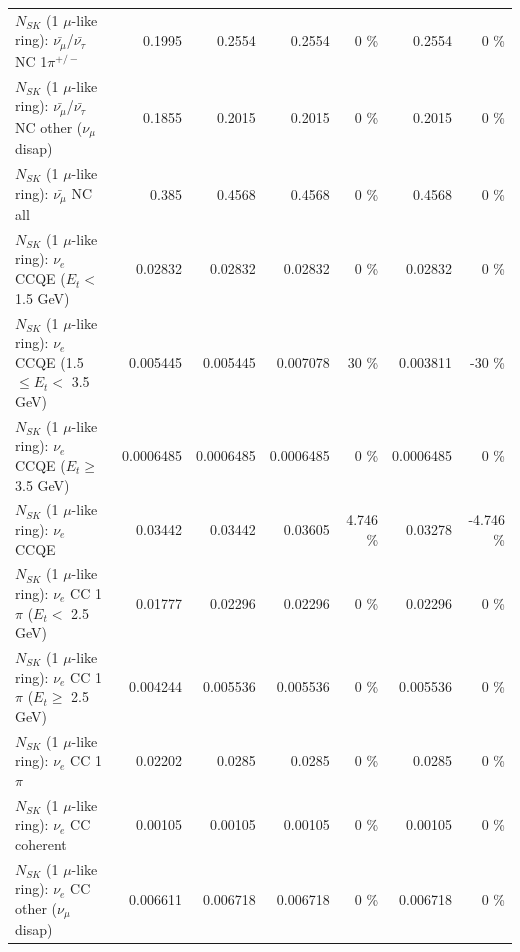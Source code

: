 \begin{table}
\begin{tabular}{| l | r | r | r  r | r  r |}
\hline
  $N_{SK}$ (1 $\mu$-like ring): $\bar{\nu_\mu}$/$\bar{\nu_\tau}$ NC 1$\pi^{+/-}$ &          0.1995 &          0.2554 &          0.2554 &        0 \%  &          0.2554 &        0 \%  \\ 
$N_{SK}$ (1 $\mu$-like ring): $\bar{\nu_\mu}$/$\bar{\nu_\tau}$ NC other ($\nu_\mu$ disap) &          0.1855 &          0.2015 &          0.2015 &        0 \%  &          0.2015 &        0 \%  \\ 
                          $N_{SK}$ (1 $\mu$-like ring): $\bar{\nu_{\mu}}$ NC all &           0.385 &          0.4568 &          0.4568 &        0 \%  &          0.4568 &        0 \%  \\ 
\hline
\hline
\hline
                  $N_{SK}$ (1 $\mu$-like ring): $\nu_e$ CCQE ($E_{t} <$ 1.5 GeV) &         0.02832 &         0.02832 &         0.02832 &        0 \%  &         0.02832 &        0 \%  \\ 
         $N_{SK}$ (1 $\mu$-like ring): $\nu_e$ CCQE (1.5 $\leq E_{t} <$ 3.5 GeV) &        0.005445 &        0.005445 &        0.007078 &       30 \%  &        0.003811 &      -30 \%  \\ 
               $N_{SK}$ (1 $\mu$-like ring): $\nu_e$ CCQE ($E_{t} \geq$ 3.5 GeV) &       0.0006485 &       0.0006485 &       0.0006485 &        0 \%  &       0.0006485 &        0 \%  \\ 
\hline
                                      $N_{SK}$ (1 $\mu$-like ring): $\nu_e$ CCQE &         0.03442 &         0.03442 &         0.03605 &    4.746 \%  &         0.03278 &   -4.746 \%  \\ 
\hline
             $N_{SK}$ (1 $\mu$-like ring): $\nu_e$ CC 1$\pi$ ($E_{t} <$ 2.5 GeV) &         0.01777 &         0.02296 &         0.02296 &        0 \%  &         0.02296 &        0 \%  \\ 
          $N_{SK}$ (1 $\mu$-like ring): $\nu_e$ CC 1$\pi$ ($E_{t} \geq$ 2.5 GeV) &        0.004244 &        0.005536 &        0.005536 &        0 \%  &        0.005536 &        0 \%  \\ 
\hline
                                 $N_{SK}$ (1 $\mu$-like ring): $\nu_e$ CC 1$\pi$ &         0.02202 &          0.0285 &          0.0285 &        0 \%  &          0.0285 &        0 \%  \\ 
                               $N_{SK}$ (1 $\mu$-like ring): $\nu_e$ CC coherent &         0.00105 &         0.00105 &         0.00105 &        0 \%  &         0.00105 &        0 \%  \\ 
                $N_{SK}$ (1 $\mu$-like ring): $\nu_e$ CC other ($\nu_\mu$ disap) &        0.006611 &        0.006718 &        0.006718 &        0 \%  &        0.006718 &        0 \%  \\ 

\end{tabular}
\end{table}
